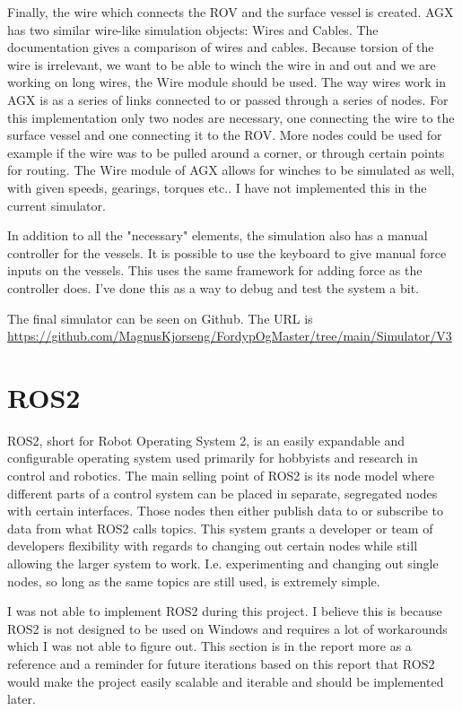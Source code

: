 Finally, the wire which connects the ROV and the surface vessel is created. AGX has two similar wire-like simulation objects: Wires and Cables. The documentation gives a comparison of wires and cables. Because torsion of the wire is irrelevant, we want to be able to winch the wire in and out and we are working on long wires, the Wire module should be used. The way wires work in AGX is as a series of links connected to or passed through a series of nodes. For this implementation only two nodes are necessary, one connecting the wire to the surface vessel and one connecting it to the ROV. More nodes could be used for example if the wire was to be pulled around a corner, or through certain points for routing. The Wire module of AGX allows for winches to be simulated as well, with given speeds, gearings, torques etc.. I have not implemented this in the current simulator.

In addition to all the "necessary" elements, the simulation also has a manual controller for the vessels. It is possible to use the keyboard to give manual force inputs on the vessels. This uses the same framework for adding force as the controller does. I've done this as a way to debug and test the system a bit.

The final simulator can be seen on Github\cite{noauthor_fordypogmastersimulator_nodate}. The URL is \url{https://github.com/MagnusKjorseng/FordypOgMaster/tree/main/Simulator/V3}

\section{ROS2}
\label{sec:ros}
ROS2, short for Robot Operating System 2, is an easily expandable and configurable operating system used primarily for hobbyists and research in control and robotics. The main selling point of ROS2 is its node model where different parts of a control system can be placed in separate, segregated nodes with certain interfaces. Those nodes then either publish data to or subscribe to data from what ROS2 calls topics. This system grants a developer or team of developers flexibility with regards to changing out certain nodes while still allowing the larger system to work. I.e. experimenting and changing out single nodes, so long as the same topics are still used, is extremely simple. 

I was not able to implement ROS2 during this project. I believe this is because ROS2 is not designed to be used on Windows and requires a lot of workarounds which I was not able to figure out. This section is in the report more as a reference and a reminder for future iterations based on this report that ROS2 would make the project easily scalable and iterable and should be implemented later. 

